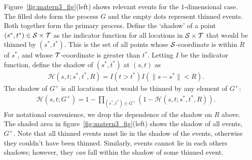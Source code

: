 \documentclass{statsoc}
\begin{document}


Figure~\ref{fig:matern3_fig}(left) shows relevant events for the $1$-dimensional case. The filled dots
form the \matern process $G$ and the empty dots represent thinned events.
Both together form the primary process. 
Define the `shadow' of a point ${(s^*,t^*) \in {\mathcal S} \times {\mathcal T}}$ as the indicator function for all locations in ${{\mathcal S} \times {\mathcal T}}$ that would
be thinned by $(s^*,t^*)$. This is the set of all points whose ${\mathcal S}$-coordinate is within $R$ of  $s^*$, and whose ${\mathcal T}$-coordinate is greater than $t^*$. 
Letting $I$ be the indicator function, define the shadow %
of $(s^*,t^*)$ at $(s,t)$ as
\begin{align}
  \mathscr{H}(s,t;s^*, t^*, R) = I(t > t^*) I(\lVert s - s^* \rVert < R). 
\end{align}
The shadow of $G^+$ is all locations that would be thinned by any element of $G^+$: %
\begin{align}
  \mathscr{H}(s,t;G^+) = 1 - \!\!\!\!\!\!\! \prod_{(s^*,t^*) \in G^+} \!\!\!\!\!\!\! \left(1 - \mathscr{H}(s,t;s^*,t^*, R) \right).
\end{align}
For notational convenience, we drop the dependence of the shadow on $R$ above.
The shaded area in figure~\ref{fig:matern3_fig}(left) shows the shadow of all \matern events, $G^+$. Note that all 
thinned events must lie in the shadow of the \matern events, otherwise 
they couldn't have been thinned. Similarly, \matern events cannot lie in each
others shadows; however, they \emph{can} fall within the shadow of some thinned event.
\end{document}
